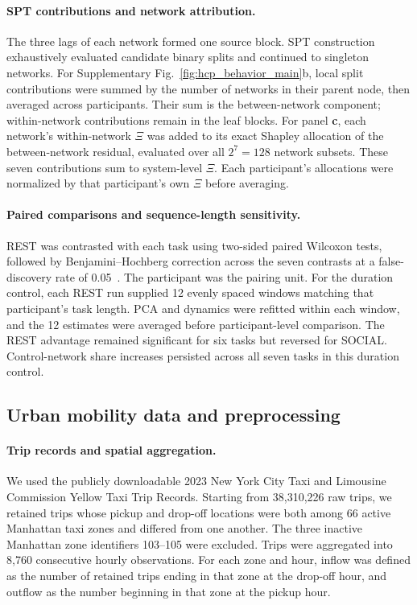 \documentclass[fleqn,10pt]{wlscirep}
\begin{document}
\paragraph{SPT contributions and network attribution.}
The three lags of each network formed one source block. SPT construction exhaustively evaluated candidate binary splits and continued to singleton networks. For Supplementary Fig.~\ref{fig:hcp_behavior_main}b, local split contributions were summed by the number of networks in their parent node, then averaged across participants. Their sum is the between-network component; within-network contributions remain in the leaf blocks. For panel \textbf{c}, each network's within-network $\Xi$ was added to its exact Shapley allocation of the between-network residual, evaluated over all $2^7=128$ network subsets. These seven contributions sum to system-level $\Xi$. Each participant's allocations were normalized by that participant's own $\Xi$ before averaging.

\paragraph{Paired comparisons and sequence-length sensitivity.}
REST was contrasted with each task using two-sided paired Wilcoxon tests, followed by Benjamini--Hochberg correction across the seven contrasts at a false-discovery rate of 0.05~\cite{benjamini1995controlling}. The participant was the pairing unit. For the duration control, each REST run supplied 12 evenly spaced windows matching that participant's task length. PCA and dynamics were refitted within each window, and the 12 estimates were averaged before participant-level comparison. The REST advantage remained significant for six tasks but reversed for SOCIAL. Control-network share increases persisted across all seven tasks in this duration control.

\subsection{Urban mobility data and preprocessing}
\label{app:nyc_taxi_data}

\paragraph{Trip records and spatial aggregation.}
We used the publicly downloadable 2023 New York City Taxi and Limousine Commission Yellow Taxi Trip Records. Starting from 38,310,226 raw trips, we retained trips whose pickup and drop-off locations were both among 66 active Manhattan taxi zones and differed from one another. The three inactive Manhattan zone identifiers 103--105 were excluded. Trips were aggregated into 8,760 consecutive hourly observations. For each zone and hour, inflow was defined as the number of retained trips ending in that zone at the drop-off hour, and outflow as the number beginning in that zone at the pickup hour.
\end{document}
